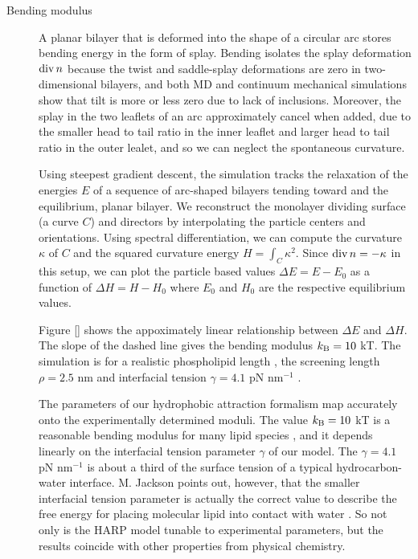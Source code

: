 \begin{description}
\item[Bending modulus] A planar bilayer that is deformed into the shape of a circular arc stores bending energy in the form of splay.
  Bending isolates the splay deformation $\operatorname{div}{n}$ because the twist and saddle-splay deformations are zero in two-dimensional bilayers,
  and both MD and continuum mechanical simulations show that tilt is more or less zero due to lack of inclusions.
  Moreover, the splay in the two leaflets of an arc approximately cancel when added, due to the smaller head to tail ratio in the inner leaflet and
  larger head to tail ratio in the outer lealet, and so we can neglect the spontaneous curvature.

  Using steepest gradient descent, the simulation tracks the relaxation of the energies $E$ of a sequence of arc-shaped bilayers tending toward and the equilibrium, planar bilayer.
  We reconstruct the monolayer dividing surface (a curve $C$) and directors by interpolating the particle centers and orientations. Using spectral differentiation,
  we can compute the curvature $\kappa$ of $C$ and the squared curvature energy $H = \int_C \kappa^2$. Since $\operatorname{div}{n} = -\kappa$ in this setup, we can plot
  the particle based values $\Delta E = E - E_0$ as a function of $\Delta H = H - H_0$ where $E_0$ and $H_0$ are the respective equilibrium values.

  Figure \ref{} shows the appoximately linear relationship between $\Delta E$ and $\Delta H$.
  The slope of the dashed line gives the bending modulus $k_{\mathrm{B}} = 10$ kT. 
  The simulation is for a realistic phospholipid length \cite{Boal},
  the screening length $\rho = 2.5$ nm \cite{Eriksson1989,Lin2005,Parsegian,Israelachvili80,TerziDeserno17}
  and  interfacial tension $\gamma=4.1$ pN nm$^{-1}$  \cite{GarciaSaez, KUZMIN2005, Petelska2012}.

  The parameters of our hydrophobic attraction formalism map accurately onto the experimentally determined moduli.  
  The value $k_{\mathrm{B}} = 10$ kT is a reasonable bending modulus for many lipid species \cite{}, and it depends linearly on
  the interfacial tension parameter $\gamma$ of our model. The $\gamma = 4.1$ pN nm$^{-1}$ is
  about a third of the surface tension of a typical hydrocarbon-water interface. M. Jackson points out, however, that the smaller interfacial tension parameter is actually the correct value 
  to describe the free energy for placing molecular lipid into contact with water \cite{}.
  So not only is the HARP model tunable to experimental parameters, but the results coincide with other properties from physical chemistry.  


\end{description}
